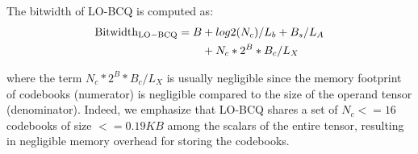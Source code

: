 The bitwidth of LO-BCQ is computed as:
\begin{align}
    \label{eq:effBitwidth}
    \mathrm{Bitwidth}_{\mathrm{LO-BCQ}} = B &+ {log2(N_c)}/{L_b} + {B_s}/{L_A} \notag \\ 
    &+ {N_c * 2^B * B_c}/{L_X}
\end{align}

where the term ${N_c * 2^B * B_c}/{L_X}$ is usually negligible since the memory footprint of codebooks (numerator) is negligible compared to the size of the operand tensor (denominator). Indeed, we emphasize that LO-BCQ shares a set of $N_c<=16$ codebooks of size $<=0.19KB$ among the scalars of the entire tensor, resulting in negligible memory overhead for storing the codebooks.



